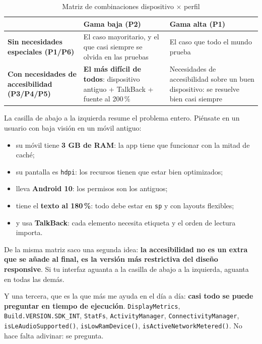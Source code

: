 \documentclass[11pt,a4paper]{article}
\newcommand{\code}[1]{\texttt{\color{ink}#1}}
\begin{document}
	\begin{table}[htbp]
		\centering
		\begin{tabularx}{\textwidth}{@{}>{\RaggedRight\arraybackslash}p{3.3cm} >{\RaggedRight\arraybackslash}X >{\RaggedRight\arraybackslash}X@{}}
			\toprule
			\rowcolor{primary}
			\textcolor{paper}{\sffamily\bfseries} & \textcolor{paper}{\sffamily\bfseries Gama baja (P2)} & \textcolor{paper}{\sffamily\bfseries Gama alta (P1)} \\
			\midrule
			\textbf{Sin necesidades especiales (P1/P6)} & El caso mayoritario, y el que casi siempre se olvida en las pruebas & El caso que todo el mundo prueba \\
			\rowcolor{soft}
			\textbf{Con necesidades de accesibilidad (P3/P4/P5)} & \textbf{El más difícil de todos}: dispositivo antiguo + TalkBack + fuente al 200\,\% & Necesidades de accesibilidad sobre un buen dispositivo: se resuelve bien casi siempre \\
			\bottomrule
		\end{tabularx}
		\caption{Matriz de combinaciones dispositivo $\times$ perfil}
	\end{table}
	
	La casilla de abajo a la izquierda resume el problema entero. Piénsate en un usuario con baja visión en un móvil antiguo:
	\begin{itemize}[leftmargin=*,itemsep=0.15em]
		\item su móvil tiene \textbf{3 GB de RAM}: la app tiene que funcionar con la mitad de caché;
		\item su pantalla es \code{hdpi}: los recursos tienen que estar bien optimizados;
		\item lleva \textbf{Android 10}: los permisos son los antiguos;
		\item tiene el \textbf{texto al 180\,\%}: todo debe estar en \code{sp} y con layouts flexibles;
		\item y usa \textbf{TalkBack}: cada elemento necesita etiqueta y el orden de lectura importa.
	\end{itemize}
	
	De la misma matriz saco una segunda idea: \textbf{la accesibilidad no es un extra que se añade al final, es la versión más restrictiva del diseño responsive}. Si tu interfaz aguanta a la casilla de abajo a la izquierda, aguanta en todas las demás.
	
	Y una tercera, que es la que más me ayuda en el día a día: \textbf{casi todo se puede preguntar en tiempo de ejecución}. \code{DisplayMetrics}, \code{Build.VERSION.SDK\_INT}, \code{StatFs}, \code{ActivityManager}, \code{ConnectivityManager}, \code{isLeAudioSupported()}, \code{isLowRamDevice()}, \code{isActiveNetworkMetered()}. No hace falta adivinar: se pregunta.
	
\end{document}
